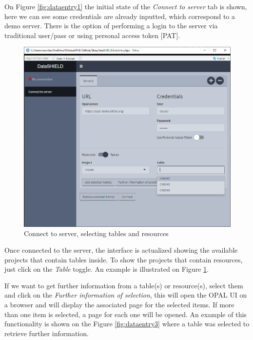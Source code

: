 \documentclass[
]{book}
\begin{document}
On Figure \ref{fig:dataentry1} the initial state of the \emph{Connect to server} tab is shown, here we can see some credentials are already inputted, which correspond to a demo server. There is the option of performing a login to the server via traditional user/pass or using personal access token {[}PAT{]}.

\begin{figure}

{\centering \includegraphics[width=12.71in]{images/data_entry2} 

}

\caption{Connect to server, selecting tables and resources}\label{fig:dataentry2}
\end{figure}

Once connected to the server, the interface is actualized showing the available projects that contain tables inside. To show the projects that contain resources, just click on the \emph{Table} toggle. An example is illustrated on Figure \ref{fig:dataentry2}.

If we want to get further information from a table(s) or resource(s), select them and click on the \emph{Further information of selection}, this will open the OPAL UI on a browser and will display the associated page for the selected items. If more than one item is selected, a page for each one will be opened. An example of this functionality is shown on the Figure \ref{fig:dataentry3} where a table was selected to retrieve further information.
\end{document}
